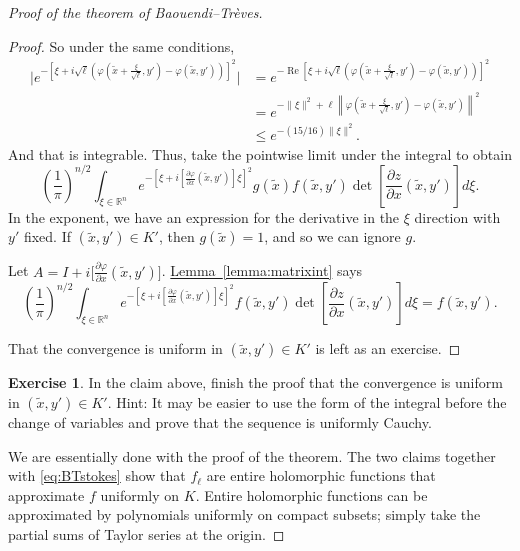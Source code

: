\documentclass[12pt,openany]{book}
\renewcommand{\Re}{\operatorname{Re}}
\newcommand{\snorm}[1]{\lVert {#1} \rVert}
\newcommand{\bbabs}[1]{\biggl\lvert {#1} \biggr\rvert}
\newcommand{\norm}[1]{\left\lVert {#1} \right\rVert}
\newcommand{\R}{{\mathbb{R}}}
\theoremstyle{plain}
\theoremstyle{remark}
\theoremstyle{definition}
\newenvironment{exbox}{%
    \def\FrameCommand{\vrule width 1pt \relax\hspace{10pt}}%
    \MakeFramed{\advance\hsize-\width\FrameRestore}%
}{%
    \endMakeFramed
}
\theoremstyle{exercise}
\newtheorem{exercise}{Exercise}[section]
\theoremstyle{example}
\newcommand{\lemmaref}[1]{\hyperref[#1]{Lemma~\ref*{#1}}}
\begin{document}
\begin{proof}[Proof of the theorem of Baouendi--Tr{\`e}ves]
\begin{proof}
So under the same conditions,
\begin{equation*}
\begin{split}
\bbabs{e^{-{\left[\xi +
i\sqrt{\ell}\left(\varphi\left(\tilde{x}+\frac{\xi}{\sqrt{\ell}},y'\right) -
\varphi(\tilde{x},y')\right)\right]}^2}}
& =
e^{-\Re {\left[\xi +
i\sqrt{\ell}\left(\varphi\left(\tilde{x}+\frac{\xi}{\sqrt{\ell}},y'\right) -
\varphi(\tilde{x},y')\right)\right]}^2}
\\
& =
e^{-\snorm{\xi}^2 + \ell
\norm{\varphi\left(\tilde{x}+\frac{\xi}{\sqrt{\ell}},y'\right) -
\varphi(\tilde{x},y')}^2}
\\
& \leq
e^{-(15/16)\snorm{\xi}^2} .
\end{split}
\end{equation*}
And that is integrable.  Thus, take the pointwise limit under the integral to obtain
\begin{equation*}
{\left(\frac{1}{\pi}\right)}^{n/2}
\int_{\xi \in \R^n}
e^{-{\left[\xi + i\left[ \frac{\partial \varphi}{\partial x}(\tilde{x},y') \right] \xi \right]}^2}
g(\tilde{x})
f(\tilde{x},y')
\det \left[\frac{\partial z}{\partial
x}(\tilde{x},y')\right] d\xi .
\end{equation*}
In the exponent, we have an expression for the derivative
in the $\xi$ direction with $y'$ fixed.  If $(\tilde{x},y') \in K'$, then
$g(\tilde{x}) = 1$, and so we can ignore $g$.

Let $A = I + i \bigl[ \frac{\partial \varphi}{\partial x}(\tilde{x},y')
\bigr]$.  \lemmaref{lemma:matrixint} says
\begin{equation*}
{\left(\frac{1}{\pi}\right)}^{n/2}
\int_{\xi \in \R^n}
e^{-{\left[\xi + i\left[ \frac{\partial \varphi}{\partial x}(\tilde{x},y') \right] \xi \right]}^2}
f(\tilde{x},y')
\det \left[\frac{\partial z}{\partial
x}(\tilde{x},y')\right] d\xi  = f(\tilde{x},y') .
\end{equation*}

That the convergence is uniform in
$(\tilde{x},y') \in K'$ is left as an exercise.
\end{proof}

\begin{exbox}
\begin{exercise}
In the claim above, finish the proof that the convergence is
uniform in $(\tilde{x},y') \in K'$.
Hint: It may be easier to
use the form of the integral before the change of variables
and prove that the sequence is uniformly Cauchy.
\end{exercise}
\end{exbox}

We are essentially done with the proof of the theorem.
The two claims together with \eqref{eq:BTstokes} show that $f_\ell$ are entire
holomorphic functions that approximate $f$ uniformly on $K$.  Entire holomorphic
functions can be approximated by polynomials uniformly on compact subsets;
simply take the partial sums of Taylor series at the origin.
\end{proof}
\end{document}
